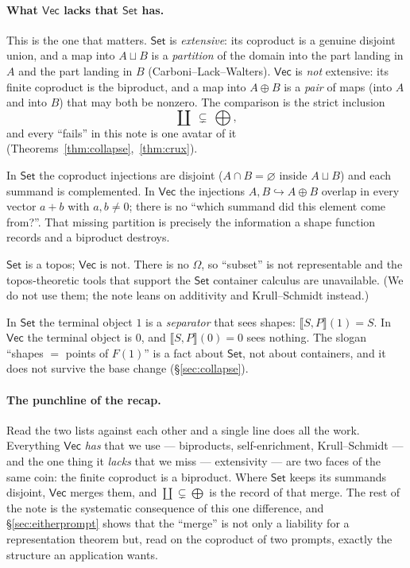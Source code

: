 \documentclass[11pt]{amsart}
\theoremstyle{plain}
\theoremstyle{definition}
\renewcommand{\Vec}{\mathsf{Vec}}
\newcommand{\Set}{\mathsf{Set}}
\newcommand{\ext}[1]{\llbracket #1 \rrbracket}
\DeclareMathOperator{\dcoprod}{\textstyle\coprod}
\begin{document}
\paragraph{What $\Vec$ lacks that $\Set$ has.}
\begin{description}[leftmargin=1.4em,style=nextline]
\item[Extensivity.] This is the one that matters. $\Set$ is \emph{extensive}: its
  coproduct is a genuine disjoint union, and a map into $A\sqcup B$ is a
  \emph{partition} of the domain into the part landing in $A$ and the part landing in
  $B$ (Carboni--Lack--Walters). $\Vec$ is \emph{not} extensive: its finite coproduct
  is the biproduct, and a map into $A\oplus B$ is a \emph{pair} of maps (into $A$ and
  into $B$) that may both be nonzero. The comparison is the strict inclusion
  \[
    \dcoprod\ \subsetneq\ \bigoplus,
  \]
  and every ``fails'' in this note is one avatar of it
  (Theorems~\ref{thm:collapse},~\ref{thm:crux}).
\item[Disjoint, complemented injections.] In $\Set$ the coproduct injections are
  disjoint ($A\cap B=\varnothing$ inside $A\sqcup B$) and each summand is
  complemented. In $\Vec$ the injections $A,B\hookrightarrow A\oplus B$ overlap in
  every vector $a+b$ with $a,b\neq0$; there is no ``which summand did this element
  come from?''. That missing partition is precisely the information a shape function
  records and a biproduct destroys.
\item[A subobject classifier.] $\Set$ is a topos; $\Vec$ is not. There is no
  $\Omega$, so ``subset'' is not representable and the topos-theoretic tools that
  support the $\Set$ container calculus are unavailable. (We do not use them; the
  note leans on additivity and Krull--Schmidt instead.)
\item[A shape-detecting terminal object.] In $\Set$ the terminal object $1$ is a
  \emph{separator} that sees shapes: $\ext{S,P}(1)=S$. In $\Vec$ the terminal object
  is $0$, and $\ext{S,P}(0)=0$ sees nothing. The slogan ``shapes $=$ points of
  $F(1)$'' is a fact about $\Set$, not about containers, and it does not survive the
  base change (\S\ref{sec:collapse}).
\end{description}

\paragraph{The punchline of the recap.}
Read the two lists against each other and a single line does all the work. Everything
$\Vec$ \emph{has} that we use --- biproducts, self-enrichment, Krull--Schmidt --- and
the one thing it \emph{lacks} that we miss --- extensivity --- are two faces of the
same coin: the finite coproduct is a biproduct. Where $\Set$ keeps its summands
disjoint, $\Vec$ merges them, and $\dcoprod\subsetneq\bigoplus$ is the record of that
merge. The rest of the note is the systematic consequence of this one difference, and
\S\ref{sec:eitherprompt} shows that the ``merge'' is not only a liability for a
representation theorem but, read on the coproduct of two prompts, exactly the
structure an application wants.
\end{document}
